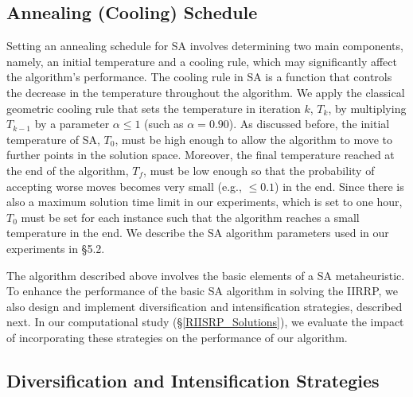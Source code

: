 \documentclass[11pt]{article}
\begin{document}

\subsection{Annealing (Cooling) Schedule}  \label{s:res4}

Setting an annealing schedule for SA involves determining two main components, namely, an initial temperature and a cooling rule, which may significantly affect the algorithm's performance. The cooling rule in SA is a function that controls the decrease in the temperature throughout the algorithm. We apply the classical geometric cooling rule that sets the temperature in iteration $k$, $T_{k}$, by multiplying $T_{k-1}$ by a parameter $\alpha \le 1$ (such as $\alpha=0.90$). As discussed before, the initial temperature of SA, $T_{0}$, must be high enough to allow the algorithm to move to further points in the solution space. Moreover, the final temperature reached at the end of the algorithm, $T_{f}$, must be low enough so that the probability of accepting worse moves becomes very small (e.g., $\le 0.1$) in the end. Since there is also a maximum solution time limit in our experiments, which is set to one hour, $T_{0}$ must be set for each instance such that the algorithm reaches a small temperature in the end. We describe the SA algorithm parameters used in our experiments in \S 5.2.



 


The algorithm described above involves the basic elements of a SA metaheuristic. To enhance the performance of the basic SA algorithm in solving the IIRRP, we also design and implement diversification and intensification strategies, described next. In our computational study (\S \ref{RIISRP_Solutions}), we evaluate the impact of incorporating these strategies on the performance of our algorithm.


\subsection{Diversification and Intensification Strategies}  \label{s:res3}
\end{document}

